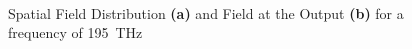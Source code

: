 \begin{figure}%
\centering
	\\%
\caption{Spatial Field Distribution \textbf{(a)} and Field at the Output \textbf{(b)} for a frequency of 195~THz}%
\label{fig:13_54}%
\end{figure}

